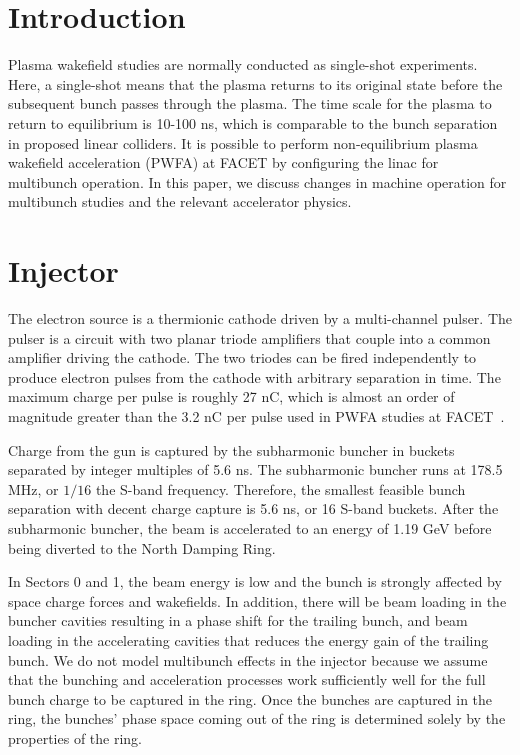 \documentclass[aps,prl,preprint,groupedaddress]{revtex4-1}
\begin{document}
\section{Introduction}
Plasma wakefield studies are normally conducted as single-shot experiments. Here, a single-shot means that the plasma returns to its original state before the subsequent bunch passes through the plasma. The time scale for the plasma to return to equilibrium is 10-100 ns, which is comparable to the bunch separation in proposed linear colliders. It is possible to perform non-equilibrium plasma wakefield acceleration (PWFA) at FACET by configuring the linac for multibunch operation. In this paper, we discuss changes in machine operation for multibunch studies and the relevant accelerator physics.

\section{Injector}
The electron source is a thermionic cathode driven by a multi-channel pulser. The pulser is a circuit with two planar triode amplifiers that couple into a common amplifier driving the cathode. The two triodes can be fired independently to produce electron pulses from the cathode with arbitrary separation in time. The maximum charge per pulse is roughly 27 nC, which is almost an order of magnitude greater than the 3.2 nC per pulse used in PWFA studies at FACET~\cite{gun}.

Charge from the gun is captured by the subharmonic buncher in buckets separated by integer multiples of 5.6 ns. The subharmonic buncher runs at 178.5 MHz, or $1/16$ the S-band frequency. Therefore, the smallest feasible bunch separation with decent charge capture is 5.6 ns, or 16 S-band buckets. After the subharmonic buncher, the beam is accelerated to an energy of 1.19 GeV before being diverted to the North Damping Ring. 

In Sectors 0 and 1, the beam energy is low and the bunch is strongly affected by space charge forces and wakefields. In addition, there will be beam loading in the buncher cavities resulting in a phase shift for the trailing bunch, and beam loading in the accelerating cavities that reduces the energy gain of the trailing bunch. We do not model multibunch effects in the injector because we assume that the bunching and acceleration processes work sufficiently well for the full bunch charge to be captured in the ring. Once the bunches are captured in the ring, the bunches' phase space coming out of the ring is determined solely by the properties of the ring.
\end{document}
